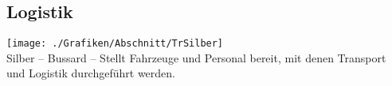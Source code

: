 \subsection{Logistik}
\texttt{[image: ./Grafiken/Abschnitt/TrSilber]}\\
Silber -- Bussard -- Stellt Fahrzeuge und Personal bereit, mit denen Transport und Logistik durchgeführt werden.